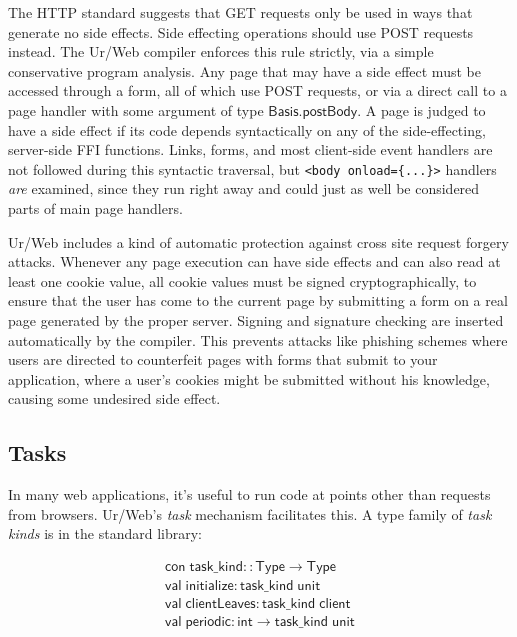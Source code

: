 \documentclass{article}
\newcommand{\mt}[1]{\mathsf{#1}}
\begin{document}
\medskip

The HTTP standard suggests that GET requests only be used in ways that generate no side effects.  Side effecting operations should use POST requests instead.  The Ur/Web compiler enforces this rule strictly, via a simple conservative program analysis.  Any page that may have a side effect must be accessed through a form, all of which use POST requests, or via a direct call to a page handler with some argument of type $\mt{Basis.postBody}$.  A page is judged to have a side effect if its code depends syntactically on any of the side-effecting, server-side FFI functions.  Links, forms, and most client-side event handlers are not followed during this syntactic traversal, but \texttt{<body onload=\{...\}>} handlers \emph{are} examined, since they run right away and could just as well be considered parts of main page handlers.

Ur/Web includes a kind of automatic protection against cross site request forgery attacks.  Whenever any page execution can have side effects and can also read at least one cookie value, all cookie values must be signed cryptographically, to ensure that the user has come to the current page by submitting a form on a real page generated by the proper server.  Signing and signature checking are inserted automatically by the compiler.  This prevents attacks like phishing schemes where users are directed to counterfeit pages with forms that submit to your application, where a user's cookies might be submitted without his knowledge, causing some undesired side effect.

\subsection{Tasks}

In many web applications, it's useful to run code at points other than requests from browsers.  Ur/Web's \emph{task} mechanism facilitates this.  A type family of \emph{task kinds} is in the standard library:

$$\begin{array}{l}
\mt{con} \; \mt{task\_kind} :: \mt{Type} \to \mt{Type} \\
\mt{val} \; \mt{initialize} : \mt{task\_kind} \; \mt{unit} \\
\mt{val} \; \mt{clientLeaves} : \mt{task\_kind} \; \mt{client} \\
\mt{val} \; \mt{periodic} : \mt{int} \to \mt{task\_kind} \; \mt{unit}
\end{array}$$
\end{document}
